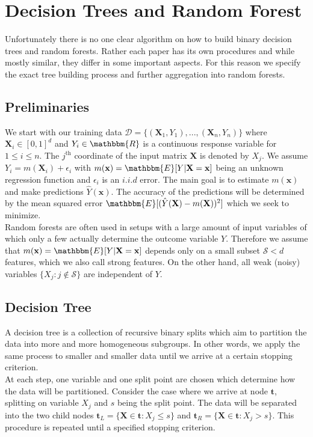 \par{
\section{Decision Trees and Random Forest}

Unfortunately there is no one clear algorithm on how to build binary decision trees and random forests. Rather each paper has its own procedures and while mostly similar, they differ in some important aspects. For this reason we specify the exact tree building process and further aggregation into random forests. 

\subsection{Preliminaries}

We start with our training data $\mathcal{D} = \{(\mathbf{X}_1, Y_1), ..., (\mathbf{X}_n, Y_n)\}$ where $\mathbf{X}_i \in [0, 1]^d$ and $Y_i \in \mathbbm{R}$ is a continuous response variable for $1 \leq i \leq n$. The $j^{\text{th}}$ coordinate of the input matrix $\mathbf{X}$ is denoted by $X_j$. We assume $Y_i = m(\mathbf{X}_i) + \epsilon_i$ with $m(\mathbf{x}) = \mathbbm{E}[Y | \mathbf{X} = \mathbf{x}]$ being an unknown regression function and $\epsilon_i$ is an $i.i.d$ error. The main goal is to estimate $m(\mathbf{x})$ and make predictions $\hat{Y}(\mathbf{x})$. The accuracy of the predictions will be determined by the mean squared error $\mathbbm{E}[(\hat{Y}(\mathbf{X}) - m(\mathbf{X}))^2]$ which we seek to minimize. \\
Random forests are often used in setups with a large amount of input variables of which only a few actually determine the outcome variable $Y$. Therefore we assume that $m(\mathbf{x}) = \mathbbm{E}[Y | \mathbf{X} = \mathbf{x}]$ depends only on a small subset $\mathcal{S} < d$ features, which we also call strong features. On the other hand, all weak (noisy) variables $\{X_j: j \notin \mathcal{S} \}$ are independent of $Y$.

\subsection{Decision Tree}
A decision tree is a collection of recursive binary splits which aim to partition the data into more and more homogeneous subgroups. In other words, we apply the same process to smaller and smaller data until we arrive at a certain stopping criterion. \\
At each step, one variable and one split point are chosen which determine how the data will be partitioned. Consider the case where we arrive at node $\mathbf{t}$, splitting on variable $X_j$ and $s$ being the split point. The data will be separated into the two child nodes $\mathbf{t}_L = \{ \mathbf{X} \in \mathbf{t}: X_j \leq s \}$ and $\mathbf{t}_R = \{ \mathbf{X} \in \mathbf{t}: X_j > s \}$. This procedure is repeated until a specified stopping criterion. \\

}
